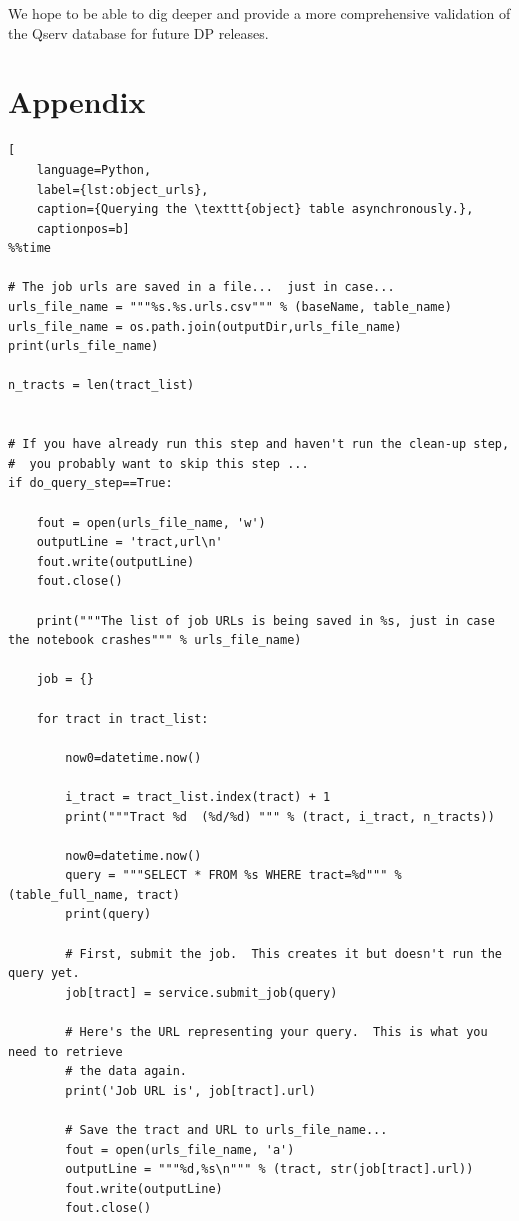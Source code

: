 \documentclass[DM,authoryear,toc]{lsstdoc}
\begin{document}
We hope to be able to dig deeper and provide a more comprehensive
validation of the Qserv database for future DP releases.

\clearpage

\appendix

\section{Appendix} \label{sec:appendix}

\begin{lstlisting}[
    language=Python,
    label={lst:object_urls},
    caption={Querying the \texttt{object} table asynchronously.},
    captionpos=b]
%%time

# The job urls are saved in a file...  just in case...
urls_file_name = """%s.%s.urls.csv""" % (baseName, table_name)
urls_file_name = os.path.join(outputDir,urls_file_name)
print(urls_file_name)

n_tracts = len(tract_list)


# If you have already run this step and haven't run the clean-up step, 
#  you probably want to skip this step ...
if do_query_step==True:

    fout = open(urls_file_name, 'w')
    outputLine = 'tract,url\n'
    fout.write(outputLine)
    fout.close()

    print("""The list of job URLs is being saved in %s, just in case the notebook crashes""" % urls_file_name)

    job = {}

    for tract in tract_list:
        
        now0=datetime.now()

        i_tract = tract_list.index(tract) + 1
        print("""Tract %d  (%d/%d) """ % (tract, i_tract, n_tracts))
        
        now0=datetime.now()
        query = """SELECT * FROM %s WHERE tract=%d""" % (table_full_name, tract)
        print(query)

        # First, submit the job.  This creates it but doesn't run the query yet.
        job[tract] = service.submit_job(query)

        # Here's the URL representing your query.  This is what you need to retrieve
        # the data again.
        print('Job URL is', job[tract].url)
    
        # Save the tract and URL to urls_file_name...
        fout = open(urls_file_name, 'a')
        outputLine = """%d,%s\n""" % (tract, str(job[tract].url))
        fout.write(outputLine)
        fout.close()


\end{lstlisting}
\end{document}
